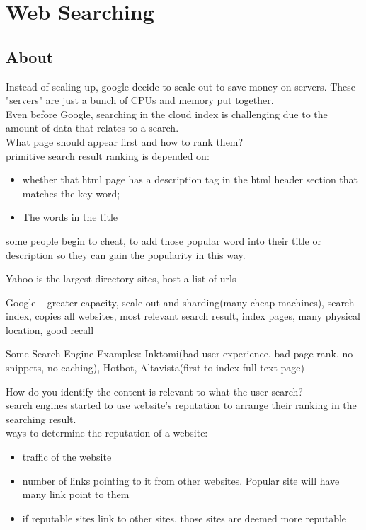 \documentclass[fancy,11pt,titlestyle=display]{style/elegantbook}
\begin{document}
\chapter{Web Searching}

\section{About}
Instead of scaling up, google decide to scale out to save money on servers. These "servers" are just a bunch of CPUs and memory put together.\\

Even before Google, searching in the cloud index is challenging due to the amount of data that relates to a search.\\

What page should appear first and how to rank them? \\
primitive search result ranking is depended on:
\begin{itemize}
    \item whether that html page has a description tag in the html header section that matches the key word;
    \item The words in the title
\end{itemize}

some people begin to cheat, to add those popular word into their title or description so they can gain the popularity in this way.

Yahoo is the largest directory sites, host a list of urls

Google – greater capacity, scale out and sharding(many cheap machines), search index, copies all websites, most relevant search result, index pages, many physical location, good recall

Some Search Engine Examples: Inktomi(bad user experience, bad page rank, no snippets, no caching), Hotbot, Altavista(first to index full text page)

How do you identify the content is relevant to what the user search?\\

search engines started to use website's reputation to arrange their ranking in the searching result.\\
ways to determine the reputation of a website:\\
\begin{itemize}
    \item traffic of the website
    \item number of links pointing to it from other websites. Popular site will have many link point to them
    \item if reputable sites link to other sites, those sites are deemed more reputable
\end{itemize}{}    
\end{document}
